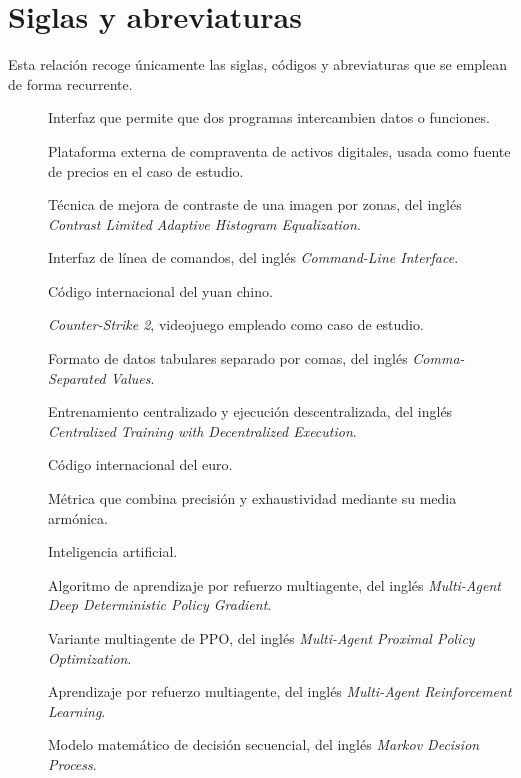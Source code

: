 \chapter*{Siglas y abreviaturas}
\indicetoprule

Esta relación recoge únicamente las siglas, códigos y abreviaturas que se emplean de forma recurrente.
\begin{description}
  \item[] Interfaz que permite que dos programas intercambien datos o funciones.
  \item[] Plataforma externa de compraventa de activos digitales, usada como fuente de precios en el caso de estudio.
  \item[] Técnica de mejora de contraste de una imagen por zonas, del inglés \emph{Contrast Limited Adaptive Histogram Equalization}.
  \item[] Interfaz de línea de comandos, del inglés \emph{Command-Line Interface}.
  \item[] Código internacional del yuan chino.
  \item[] \emph{Counter-Strike 2}, videojuego empleado como caso de estudio.
  \item[] Formato de datos tabulares separado por comas, del inglés \emph{Comma-Separated Values}.
  \item[] Entrenamiento centralizado y ejecución descentralizada, del inglés \emph{Centralized Training with Decentralized Execution}.
  \item[] Código internacional del euro.
  \item[] Métrica que combina precisión y exhaustividad mediante su media armónica.
  \item[] Inteligencia artificial.
  \item[] Algoritmo de aprendizaje por refuerzo multiagente, del inglés \emph{Multi-Agent Deep Deterministic Policy Gradient}.
  \item[] Variante multiagente de PPO, del inglés \emph{Multi-Agent Proximal Policy Optimization}.
  \item[] Aprendizaje por refuerzo multiagente, del inglés \emph{Multi-Agent Reinforcement Learning}.
  \item[] Modelo matemático de decisión secuencial, del inglés \emph{Markov Decision Process}.

\end{description}

